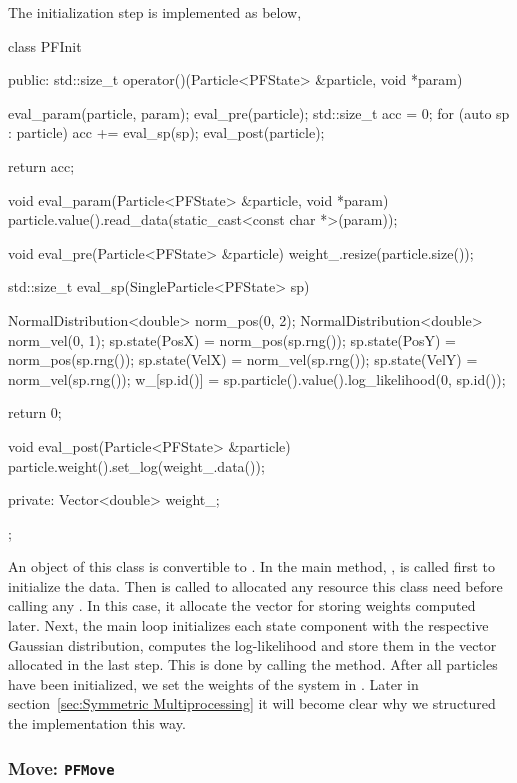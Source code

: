 The initialization step is implemented as below,
\begin{cppcode}
  class PFInit
  {
      public:
      std::size_t operator()(Particle<PFState> &particle, void *param)
      {
          eval_param(particle, param);
          eval_pre(particle);
          std::size_t acc = 0;
          for (auto sp : particle)
              acc += eval_sp(sp);
          eval_post(particle);

          return acc;
      }

      void eval_param(Particle<PFState> &particle, void *param)
      {
          particle.value().read_data(static_cast<const char *>(param));
      }

      void eval_pre(Particle<PFState> &particle)
      {
          weight_.resize(particle.size());
      }

      std::size_t eval_sp(SingleParticle<PFState> sp)
      {
          NormalDistribution<double> norm_pos(0, 2);
          NormalDistribution<double> norm_vel(0, 1);
          sp.state(PosX) = norm_pos(sp.rng());
          sp.state(PosY) = norm_pos(sp.rng());
          sp.state(VelX) = norm_vel(sp.rng());
          sp.state(VelY) = norm_vel(sp.rng());
          w_[sp.id()] = sp.particle().value().log_likelihood(0, sp.id());

          return 0;
      }

      void eval_post(Particle<PFState> &particle)
      {
          particle.weight().set_log(weight_.data());
      }

      private:
      Vector<double> weight_;
  };
\end{cppcode}
An object of this class is convertible to
. In the main method,
,  is called first to initialize
the data. Then  is called to allocated any resource this
class need before calling any . In this case, it allocate
the vector  for storing weights computed later. Next, the main
loop initializes each state component with the respective Gaussian
distribution, computes the log-likelihood and store them in the vector
allocated in the last step. This is done by calling the 
method. After all particles have been initialized, we set the weights of the
system in . Later in section~\ref{sec:Symmetric
  Multiprocessing} it will become clear why we structured the implementation
this way.

\subsubsection{Move: \texttt{PFMove}}


